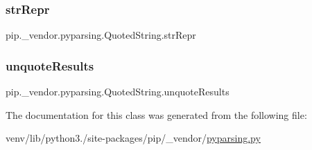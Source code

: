 \subsubsection{\texorpdfstring{str\+Repr}{strRepr}}
{\footnotesize\ttfamily pip.\+\_\+vendor.\+pyparsing.\+Quoted\+String.\+str\+Repr}

\mbox{\label{classpip_1_1__vendor_1_1pyparsing_1_1QuotedString_a454062dbd08fda7582f5f6e162cec42a}} 
\subsubsection{\texorpdfstring{unquote\+Results}{unquoteResults}}
{\footnotesize\ttfamily pip.\+\_\+vendor.\+pyparsing.\+Quoted\+String.\+unquote\+Results}



The documentation for this class was generated from the following file\+:\begin{DoxyCompactItemize}
\item 
venv/lib/python3./site-\/packages/pip/\+\_\+vendor/\hyperlink{pip_2__vendor_2pyparsing_8py}{pyparsing.\+py}\end{DoxyCompactItemize}
